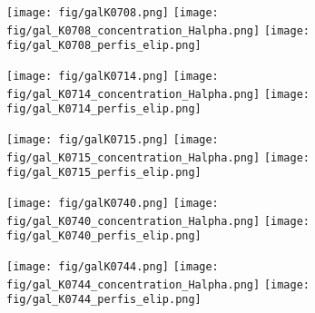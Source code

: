 \begin{figure}[!ht]
\begin{center}
\setcaptionmargin{1cm}
\texttt{[image: fig/galK0708.png]}
\texttt{[image: fig/gal\_K0708\_concentration\_Halpha.png]}
\texttt{[image: fig/gal\_K0708\_perfis\_elip.png]}
\end{center}
\end{figure}


\begin{figure}[!ht]
\begin{center}
\setcaptionmargin{1cm}
\texttt{[image: fig/galK0714.png]}
\texttt{[image: fig/gal\_K0714\_concentration\_Halpha.png]}
\texttt{[image: fig/gal\_K0714\_perfis\_elip.png]}
\end{center}
\end{figure}


\begin{figure}[!ht]
\begin{center}
\setcaptionmargin{1cm}
\texttt{[image: fig/galK0715.png]}
\texttt{[image: fig/gal\_K0715\_concentration\_Halpha.png]}
\texttt{[image: fig/gal\_K0715\_perfis\_elip.png]}
\end{center}
\end{figure}


\begin{figure}[!ht]
\begin{center}
\setcaptionmargin{1cm}
\texttt{[image: fig/galK0740.png]}
\texttt{[image: fig/gal\_K0740\_concentration\_Halpha.png]}
\texttt{[image: fig/gal\_K0740\_perfis\_elip.png]}
\end{center}
\end{figure}


\begin{figure}[!ht]
\begin{center}
\setcaptionmargin{1cm}
\texttt{[image: fig/galK0744.png]}
\texttt{[image: fig/gal\_K0744\_concentration\_Halpha.png]}
\texttt{[image: fig/gal\_K0744\_perfis\_elip.png]}
\end{center}
\end{figure}


